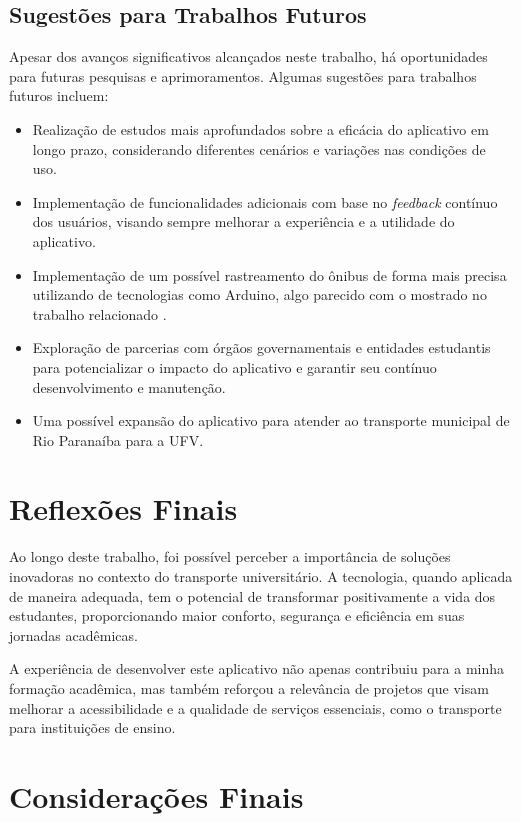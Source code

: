 \documentclass[
    12pt,                   %
    openright,              %
    oneside,                %
    a4paper,                %
    sumario=tradicional,    %
    english,                %
    brazil,                 %
    ]{abntex2}
\begin{document}
\subsection{Sugestões para Trabalhos Futuros}

Apesar dos avanços significativos alcançados neste trabalho, há oportunidades para futuras pesquisas e aprimoramentos. Algumas sugestões para trabalhos futuros incluem:
\begin{itemize}
	\item Realização de estudos mais aprofundados sobre a eficácia do aplicativo em longo prazo, considerando diferentes cenários e variações nas condições de uso.
	\item Implementação de funcionalidades adicionais com base no \textit{feedback} contínuo dos usuários, visando sempre melhorar a experiência e a utilidade do aplicativo.
	\item Implementação de um possível rastreamento do ônibus de forma mais precisa utilizando de tecnologias como Arduino, algo parecido com o mostrado no trabalho relacionado \cite{miranda2019infraestrutura}.
	\item Exploração de parcerias com órgãos governamentais e entidades estudantis para potencializar o impacto do aplicativo e garantir seu contínuo desenvolvimento e manutenção.
	\item Uma possível expansão do aplicativo para atender ao transporte municipal de Rio Paranaíba para a UFV.
\end{itemize}

\section{Reflexões Finais}
\label{sec:reflexoes-finais}

Ao longo deste trabalho, foi possível perceber a importância de soluções inovadoras no contexto do transporte universitário. A tecnologia, quando aplicada de maneira adequada, tem o potencial de transformar positivamente a vida dos estudantes, proporcionando maior conforto, segurança e eficiência em suas jornadas acadêmicas.

A experiência de desenvolver este aplicativo não apenas contribuiu para a minha formação acadêmica, mas também reforçou a relevância de projetos que visam melhorar a acessibilidade e a qualidade de serviços essenciais, como o transporte para instituições de ensino.

\section{Considerações Finais}
\label{sec:consideracoes-finais}
\end{document}

